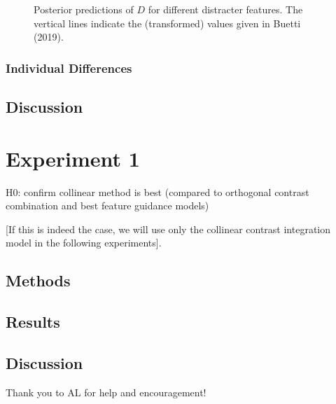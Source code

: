 \begin{figure}
\caption{Posterior predictions of $D$ for different distracter features. The vertical lines indicate the (transformed) values given in Buetti (2019).}
\label{fig:reanalysisBuetti2019}
\end{figure} 

\subsubsection{Individual Differences}

\subsection{Discussion}


\section{Experiment 1}

H0: confirm collinear method is best (compared to orthogonal contrast combination and best feature guidance models)

[If this is indeed the case, we will use only the collinear contrast integration model in the following experiments].

\subsection{Methods}

\subsection{Results}

\subsection{Discussion}



\begin{acknowledgements}
Thank you to AL for help and encouragement! 
\end{acknowledgements}


%
%


